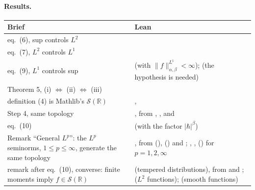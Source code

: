 \documentclass[11pt]{article}
\begin{document}
\paragraph{Results.}
\begin{center}
\begin{tabularx}{\textwidth}{@{}BL@{}}
\toprule
Brief & Lean \\
\midrule
eq.~(6), sup controls $L^2$ &  \\
eq.~(7), $L^2$ controls $L^1$ &  \\
eq.~(9), $L^1$ controls sup &  (with $\|f\|^{L^1}_{\alpha,\beta} < \infty$);
   (the hypothesis is needed) \\
Theorem 5, (i) $\Leftrightarrow$ (ii) $\Leftrightarrow$ (iii) &  \\
definition (4) is Mathlib's $\mathcal{S}(\mathbb{R})$ & ,
   \\
Step 4, same topology & , from ,
  ,  and  \\
eq.~(10) &  (with the factor $|\hbar|^\beta$) \\
Remark ``General $L^p$'': the $L^p$ seminorms, $1 \le p \le \infty$, generate the same topology & , from  (),  () and ; , ,  () for $p = 1, 2, \infty$ \\
remark after eq.~(10), converse: finite moments imply $f \in \mathcal{S}(\mathbb{R})$ &
   (tempered distributions), from
   and ;
   ($L^2$ functions); 
  (smooth functions) \\
\bottomrule
\end{tabularx}
\end{center}
\end{document}
